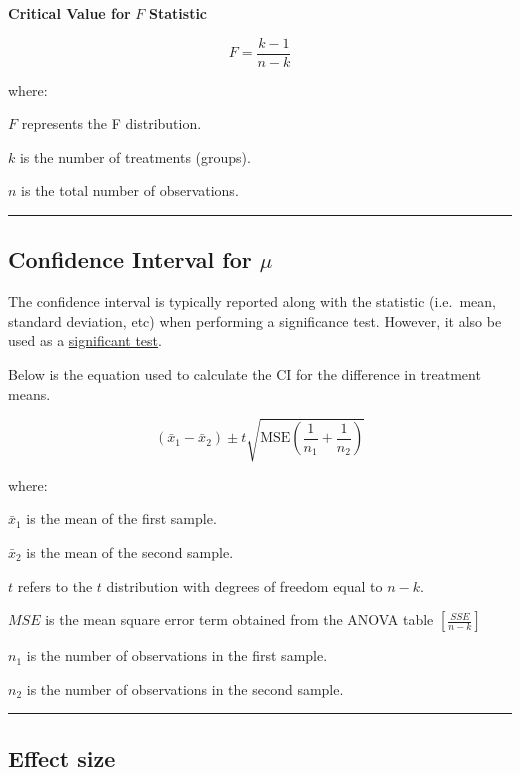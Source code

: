 \documentclass[
]{article}
\begin{document}
\textbf{Critical Value for} \(F\) \textbf{Statistic}

\[
F = \frac{k-1}{n-k}
\]

where:

\(F\) represents the F distribution.

\(k\) is the number of treatments (groups).

\(n\) is the total number of observations.

\begin{center}\rule{0.5\linewidth}{0.5pt}\end{center}

\hypertarget{confidence-interval-for-mu}{%
\subsection{\texorpdfstring{Confidence Interval for \(\mu\)}{Confidence Interval for \textbackslash mu}}\label{confidence-interval-for-mu}}

The confidence interval is typically reported along with the statistic (i.e.~mean, standard deviation, etc) when performing a significance test. However, it also be used as a \href{https://statkat.com/confidence-interval-as-test/one-sample-z-test.php}{significant test}.

Below is the equation used to calculate the CI for the difference in treatment means.

\[
(\bar{x}_{1} - \bar{x}_{2}) \pm t\sqrt{\text{MSE}\left(\frac{1}{n_{1}} + \frac{1}{n_{2}}\right)}
\]

where:

\(\bar{x}_{1}\) is the mean of the first sample.

\(\bar{x}_{2}\) is the mean of the second sample.

\(t\) refers to the \(t\) distribution with degrees of freedom equal to \(n-k\).

\(MSE\) is the mean square error term obtained from the ANOVA table \(\left[\frac{SSE}{n-k}\right]\)

\(n_{1}\) is the number of observations in the first sample.

\(n_{2}\) is the number of observations in the second sample.

\begin{center}\rule{0.5\linewidth}{0.5pt}\end{center}

\hypertarget{effect-size}{%
\subsection{Effect size}\label{effect-size}}
\end{document}
